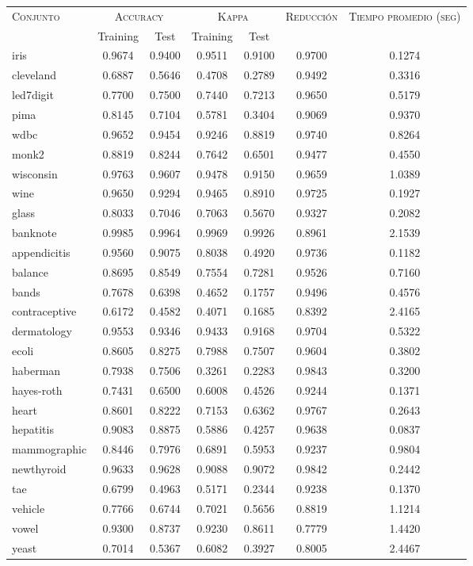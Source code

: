 \begin{table}[]
\centering
\begin{tabular}{l c c c c c c}
\hline
\multirow{2}{*}{\textsc{Conjunto}}
	& \multicolumn{2}{c}{\textsc{Accuracy}}
	& \multicolumn{2}{c}{\textsc{Kappa}}
	& \textsc{Reducción}
	& \textsc{Tiempo promedio (seg)} \\
	& Training & Test
	& Training & Test \\ 
\hline
\hline

iris & 0.9674 & 0.9400 & 0.9511 & 0.9100 & 0.9700 & 0.1274 \\
cleveland & 0.6887 & 0.5646 & 0.4708 & 0.2789 & 0.9492 & 0.3316 \\
led7digit & 0.7700 & 0.7500 & 0.7440 & 0.7213 & 0.9650 & 0.5179 \\
pima & 0.8145 & 0.7104 & 0.5781 & 0.3404 & 0.9069 & 0.9370 \\
wdbc & 0.9652 & 0.9454 & 0.9246 & 0.8819 & 0.9740 & 0.8264 \\
monk2 & 0.8819 & 0.8244 & 0.7642 & 0.6501 & 0.9477 & 0.4550 \\
wisconsin & 0.9763 & 0.9607 & 0.9478 & 0.9150 & 0.9659 & 1.0389 \\
wine & 0.9650 & 0.9294 & 0.9465 & 0.8910 & 0.9725 & 0.1927 \\
glass & 0.8033 & 0.7046 & 0.7063 & 0.5670 & 0.9327 & 0.2082 \\
banknote & 0.9985 & 0.9964 & 0.9969 & 0.9926 & 0.8961 & 2.1539 \\
appendicitis & 0.9560 & 0.9075 & 0.8038 & 0.4920 & 0.9736 & 0.1182 \\
balance & 0.8695 & 0.8549 & 0.7554 & 0.7281 & 0.9526 & 0.7160 \\
bands & 0.7678 & 0.6398 & 0.4652 & 0.1757 & 0.9496 & 0.4576 \\
contraceptive & 0.6172 & 0.4582 & 0.4071 & 0.1685 & 0.8392 & 2.4165 \\
dermatology & 0.9553 & 0.9346 & 0.9433 & 0.9168 & 0.9704 & 0.5322 \\
ecoli & 0.8605 & 0.8275 & 0.7988 & 0.7507 & 0.9604 & 0.3802 \\
haberman & 0.7938 & 0.7506 & 0.3261 & 0.2283 & 0.9843 & 0.3200 \\
hayes-roth & 0.7431 & 0.6500 & 0.6008 & 0.4526 & 0.9244 & 0.1371 \\
heart & 0.8601 & 0.8222 & 0.7153 & 0.6362 & 0.9767 & 0.2643 \\
hepatitis & 0.9083 & 0.8875 & 0.5886 & 0.4257 & 0.9638 & 0.0837 \\
mammographic & 0.8446 & 0.7976 & 0.6891 & 0.5953 & 0.9237 & 0.9804 \\
newthyroid & 0.9633 & 0.9628 & 0.9088 & 0.9072 & 0.9842 & 0.2442 \\
tae & 0.6799 & 0.4963 & 0.5171 & 0.2344 & 0.9238 & 0.1370 \\
vehicle & 0.7766 & 0.6744 & 0.7021 & 0.5656 & 0.8819 & 1.1214 \\
vowel & 0.9300 & 0.8737 & 0.9230 & 0.8611 & 0.7779 & 1.4420 \\
yeast & 0.7014 & 0.5367 & 0.6082 & 0.3927 & 0.8005 & 2.4467 \\


\end{tabular}
\end{table}
